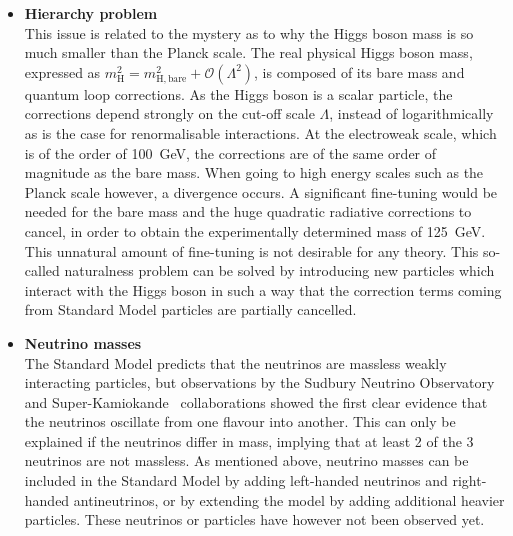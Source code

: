 \begin{itemize}
 \item[]\textbf{Hierarchy problem}\\ 
 This issue is related to the mystery as to why the Higgs boson mass is so much smaller than the Planck scale. The real physical Higgs boson mass, expressed as $m_{\mathrm{H}}^2 = m_{\mathrm{H, bare}}^2 + \mathcal{O}(\Lambda^2)$, is composed of its bare mass and quantum loop corrections. As the Higgs boson is a scalar particle, the corrections depend strongly on the cut-off scale $\Lambda$, instead of logarithmically as is the case for renormalisable interactions. At the electroweak scale, which is of the order of \SI{100}{GeV}, the corrections are of the same order of magnitude as the bare mass. When going to high energy scales such as the Planck scale however, a divergence occurs. A significant fine-tuning would be needed for the bare mass and the huge quadratic radiative corrections to cancel, in order to obtain the experimentally determined mass of \SI{125}{GeV}. This unnatural amount of fine-tuning is not desirable for any theory. This so-called naturalness problem can be solved by introducing new particles which interact with the Higgs boson in such a way that the correction terms coming from Standard Model particles are partially cancelled.
 
 \item[]\textbf{Neutrino masses}\\ 
 The Standard Model predicts that the neutrinos are massless weakly interacting particles, but observations by the Sudbury Neutrino Observatory~\cite{Ahmad:2002jz} and Super-Kamiokande~\cite{Fukuda:1998mi} collaborations showed the first clear evidence that the neutrinos oscillate from one flavour into another. This can only be explained if the neutrinos differ in mass, implying that at least 2 of the 3 neutrinos are not massless. As mentioned above, neutrino masses can be included in the Standard Model by adding left-handed neutrinos and right-handed antineutrinos, or by extending the model by adding additional heavier particles. These neutrinos or particles have however not been observed yet.
 

\end{itemize}

